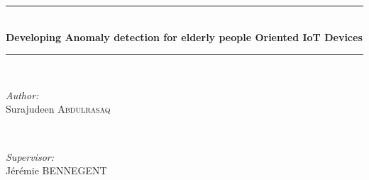 \documentclass[a4paper, parskip=full]{scrartcl}
\date{}
\begin{document}
	

\begin{titlepage}
	
	\newcommand{\HRule}{\rule{\linewidth}{0.5mm}} %
	
	\center %
	
	
	
	
	\HRule \\[0.4cm]
	{ \huge \bfseries Developing Anomaly detection for elderly people Oriented IoT Devices}\\[0.4cm] %
	\HRule \\[1.5cm]
	
	
	\begin{minipage}{0.4\textwidth}
		\begin{flushleft} \large
			\emph{Author:}\\
			Surajudeen \textsc{Abdulrasaq} %
		\end{flushleft}
	\end{minipage}
	~
	\begin{minipage}{0.4\textwidth}
		\begin{flushright} \large
			\emph{Supervisor:} \\
			Jérémie  \textsc{BENNEGENT} %
		\end{flushright}
	\end{minipage}\\[2cm]
	

\end{titlepage}
\end{document}
